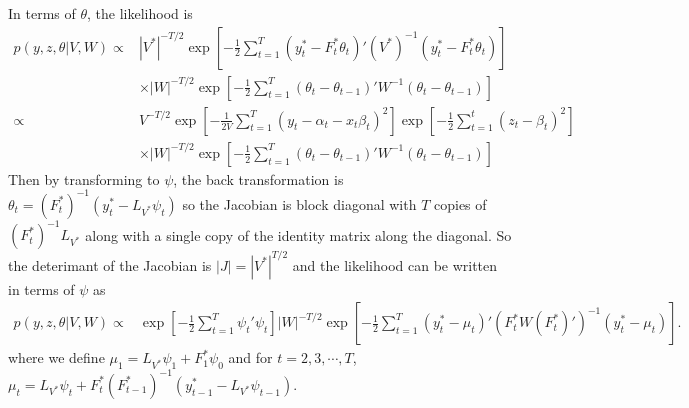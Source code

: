 \documentclass{article}
\begin{document}
In terms of $\theta$, the likelihood is
\begin{align*}
p(y,z,\theta|V,W) \propto& |V^*|^{-T/2}\exp\left[-\frac{1}{2}\sum_{t=1}^T(y_t^* - F_t^*\theta_t)'(V^*)^{-1}(y_t^* - F_t^*\theta_t)\right]\\
 &\times |W|^{-T/2}\exp\left[-\frac{1}{2}\sum_{t=1}^T(\theta_t - \theta_{t-1})'W^{-1}(\theta_t - \theta_{t-1})\right]\\
\propto & V^{-T/2}\exp\left[-\frac{1}{2V}\sum_{t=1}^T(y_t - \alpha_t - x_t\beta_t)^2\right]\exp\left[-\frac{1}{2}\sum_{t=1}^t(z_t - \beta_t)^2\right]\\
 &\times |W|^{-T/2}\exp\left[-\frac{1}{2}\sum_{t=1}^T(\theta_t - \theta_{t-1})'W^{-1}(\theta_t - \theta_{t-1})\right]
\end{align*}
Then by transforming to $\psi$, the back transformation is $\theta_t = (F_t^*)^{-1}(y_t^* - L_{V^*}\psi_t)$ so the Jacobian is block diagonal with $T$ copies of $(F_t^*)^{-1}L_{V^*}$ along with a single copy of the identity matrix along the diagonal. So the deterimant of the Jacobian is $|J| = |V^*|^{T/2}$ and the likelihood can be written in terms of $\psi$ as
\begin{align}
p(y,z,\theta|V,W) \propto& \exp\left[-\frac{1}{2}\sum_{t=1}^T\psi_t'\psi_t\right] |W|^{-T/2}\exp\left[-\frac{1}{2}\sum_{t=1}^T(y_t^* - \mu_t)'(F_t^*W (F_t^*)')^{-1}(y^*_t - \mu_t)\right] \label{Fpsilike}.
\end{align}
where we define $\mu_1 = L_{V^*}\psi_1 + F^*_1\psi_0$ and for $t=2,3,\cdots,T$, $\mu_t =L_{V^*}\psi_t + F^*_t(F^*_{t-1})^{-1}(y^*_{t-1} - L_{V^*}\psi_{t-1})$. 
\end{document}

